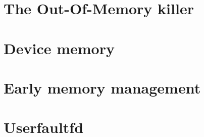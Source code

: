 \documentclass[a4paper,oneside]{scrbook}
\begin{document}


\chapter{The Out-Of-Memory killer}



\chapter{Device memory}



\chapter{Early memory management}



\chapter{Userfaultfd}



\backmatter
\printindex
\end{document}
